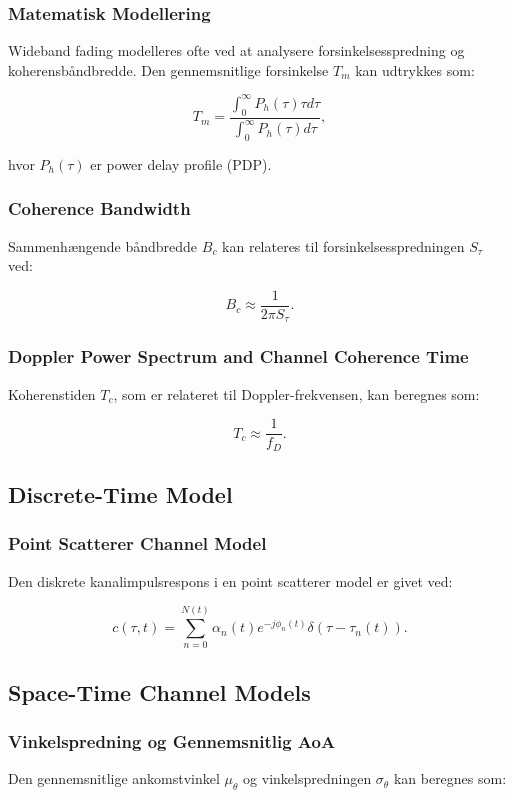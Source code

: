 \documentclass[a4paper,12pt]{book}
\begin{document}
	\subsubsection{Matematisk Modellering}
	Wideband fading modelleres ofte ved at analysere forsinkelsesspredning og koherensbåndbredde. Den gennemsnitlige forsinkelse \( T_m \) kan udtrykkes som:
	
	\[
	T_m = \frac{\int_0^\infty P_h(\tau) \tau d\tau}{\int_0^\infty P_h(\tau) d\tau},
	\]
	
	hvor \( P_h(\tau) \) er power delay profile (PDP).
	
	\subsubsection{Coherence Bandwidth}
	Sammenhængende båndbredde \( B_c \) kan relateres til forsinkelsesspredningen \( S_\tau \) ved:
	
	\[
	B_c \approx \frac{1}{2 \pi S_\tau}.
	\]
	
	\subsubsection{Doppler Power Spectrum and Channel Coherence Time}
	Koherenstiden \( T_c \), som er relateret til Doppler-frekvensen, kan beregnes som:
	
	\[
	T_c \approx \frac{1}{f_D}.
	\]
	
	\subsection{Discrete-Time Model}
	\subsubsection*{Point Scatterer Channel Model}
	Den diskrete kanalimpulsrespons i en point scatterer model er givet ved:
	
	\[
	c(\tau, t) = \sum_{n=0}^{N(t)} \alpha_n(t) e^{-j \phi_n(t)} \delta(\tau - \tau_n(t)).
	\]
	
	\subsection{Space-Time Channel Models}
	\subsubsection{Vinkelspredning og Gennemsnitlig AoA}
	Den gennemsnitlige ankomstvinkel \( \mu_\theta \) og vinkelspredningen \( \sigma_\theta \) kan beregnes som:
	
\end{document}

